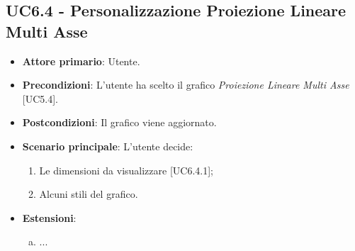 \subsection{UC6.4 - Personalizzazione Proiezione Lineare Multi Asse}
\begin{itemize}
	\item \textbf{Attore primario}: Utente.
	
	\item \textbf{Precondizioni}: L'utente ha scelto il grafico \textit{Proiezione Lineare Multi Asse} [UC5.4].
	
	\item \textbf{Postcondizioni}: Il grafico viene aggiornato.
	
	\item \textbf{Scenario principale}: L'utente decide:
	
\begin{enumerate}
\item Le dimensioni da visualizzare [UC6.4.1];
\item Alcuni stili del grafico.
\end{enumerate}	
		
	\item \textbf{Estensioni}:
	\begin{enumerate}[(a)]
		\item ...
	\end{enumerate}
\end{itemize}